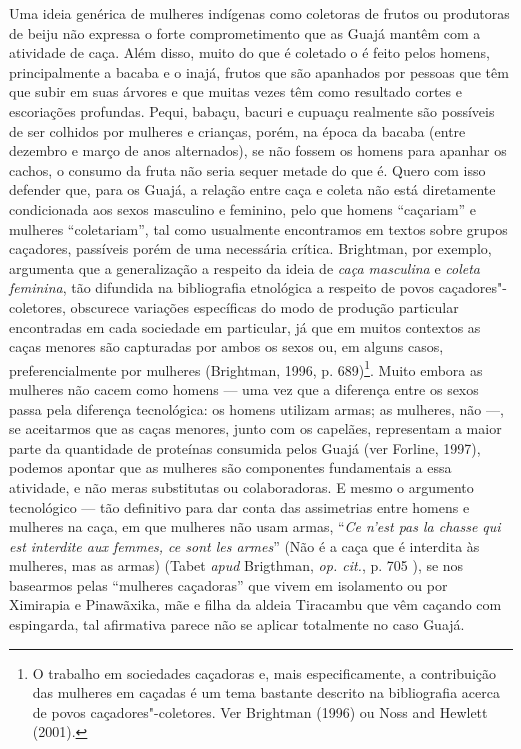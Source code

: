 Uma ideia genérica de mulheres indígenas como coletoras de frutos ou
produtoras de beiju não expressa o forte comprometimento que as Guajá
mantêm com a atividade de caça. Além disso, muito do que é coletado o é
feito pelos homens, principalmente a bacaba e o inajá, frutos que são
apanhados por pessoas que têm que subir em suas árvores e que muitas
vezes têm como resultado cortes e escoriações profundas. Pequi, babaçu,
bacuri e cupuaçu realmente são possíveis de ser colhidos por mulheres e
crianças, porém, na época da bacaba (entre dezembro e março de anos
alternados), se não fossem os homens para apanhar os cachos, o consumo
da fruta não seria sequer metade do que é. Quero com isso defender que,
para os Guajá, a relação entre caça e coleta não está diretamente
condicionada aos sexos masculino e feminino, pelo que homens ``caçariam''
e mulheres ``coletariam'', tal como usualmente encontramos em textos sobre
grupos caçadores, passíveis porém de uma necessária crítica. Brightman,
por exemplo, argumenta que a generalização a respeito da ideia de
\emph{caça masculina} e \emph{coleta feminina}, tão difundida na
bibliografia etnológica a respeito de povos caçadores"-coletores,
obscurece variações específicas do modo de produção particular
encontradas em cada sociedade em particular, já que em muitos contextos
as caças menores são capturadas por ambos os sexos ou, em alguns casos,
preferencialmente por mulheres (Brightman, 1996, p. 689)\footnote{O
  trabalho em sociedades caçadoras e, mais especificamente, a
  contribuição das mulheres em caçadas é um tema bastante descrito na
  bibliografia acerca de povos caçadores"-coletores. Ver Brightman (1996)
  ou Noss and Hewlett (2001).}. Muito embora as mulheres não cacem como
homens --- uma vez que a diferença entre os sexos passa pela diferença
tecnológica: os homens utilizam armas; as mulheres, não ---, se aceitarmos
que as caças menores, junto com os capelães, representam a maior parte
da quantidade de proteínas consumida pelos Guajá (ver Forline, 1997),
podemos apontar que as mulheres são componentes fundamentais a essa
atividade, e não meras substitutas ou colaboradoras. E mesmo o argumento
tecnológico --- tão definitivo para dar conta das assimetrias entre homens
e mulheres na caça, em que mulheres não usam armas, ``\emph{Ce n'est pas
la chasse qui est interdite aux femmes, ce sont les armes}'' (Não é a
caça que é interdita às mulheres, mas as armas) (Tabet \emph{apud} Brigthman,
\emph{op. cit.}, p. 705 ), se nos basearmos pelas ``mulheres caçadoras'' que
vivem em isolamento ou por Ximirapia e Pinawãxika, mãe e filha da aldeia
Tiracambu que vêm caçando com espingarda, tal afirmativa parece não se
aplicar totalmente no caso Guajá.

